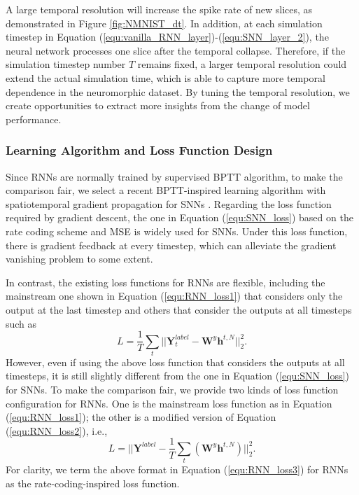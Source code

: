 \documentclass[journal,10pt,twocolumn]{IEEETran}
\begin{document}
A large temporal resolution will increase the spike rate of new slices, as demonstrated in Figure \ref{fig:NMNIST_dt}. In addition, at each simulation timestep in Equation (\ref{equ:vanilla_RNN_layer})-(\ref{equ:SNN_layer_2}), the neural network processes one slice after the temporal collapse. Therefore, if the simulation timestep number $T$ remains fixed, a larger temporal resolution could extend the actual simulation time, which is able to capture more temporal dependence in the neuromorphic dataset. By tuning the temporal resolution, we create opportunities to extract more insights from the change of model performance.

\bigskip
\subsubsection{Learning Algorithm and Loss Function Design}\quad

Since RNNs are normally trained by supervised BPTT algorithm, to make the comparison fair, we select a recent BPTT-inspired learning algorithm with spatiotemporal gradient propagation for SNNs \cite{wu2018spatio}. Regarding the loss function required by gradient descent, the one in Equation (\ref{equ:SNN_loss}) based on the rate coding scheme and MSE is widely used for SNNs. Under this loss function, there is gradient feedback at every timestep, which can alleviate the gradient vanishing problem to some extent.


In contrast, the existing loss functions for RNNs are flexible, including the mainstream one shown in Equation (\ref{equ:RNN_loss1}) that considers only the output at the last timestep and others that consider the outputs at all timesteps \cite{werbos1990backpropagation,boden2002guide,vlachas2020backpropagation} such as 
\begin{equation}
\label{equ:RNN_loss2}
L = \frac{1}{T}\sum_t ||\pmb{Y}_t^{label} - \pmb{W}^y\pmb{h}^{t,N}||_{2}^{2}.
\end{equation}
However, even if using the above loss function that considers the outputs at all timesteps, it is still slightly different from the one in Equation (\ref{equ:SNN_loss}) for SNNs. To make the comparison fair, we provide two kinds of loss function configuration for RNNs. One is the mainstream loss function as in Equation (\ref{equ:RNN_loss1}); the other is a modified version of Equation (\ref{equ:RNN_loss2}), i.e.,
\begin{equation}
\label{equ:RNN_loss3}
L = ||\pmb{Y}^{label}-\frac{1}{T}\sum_t (\pmb{W}^y\pmb{h}^{t,N})||_{2}^{2}.
\end{equation}
For clarity, we term the above format in Equation (\ref{equ:RNN_loss3}) for RNNs as the rate-coding-inspired loss function.
\end{document}
